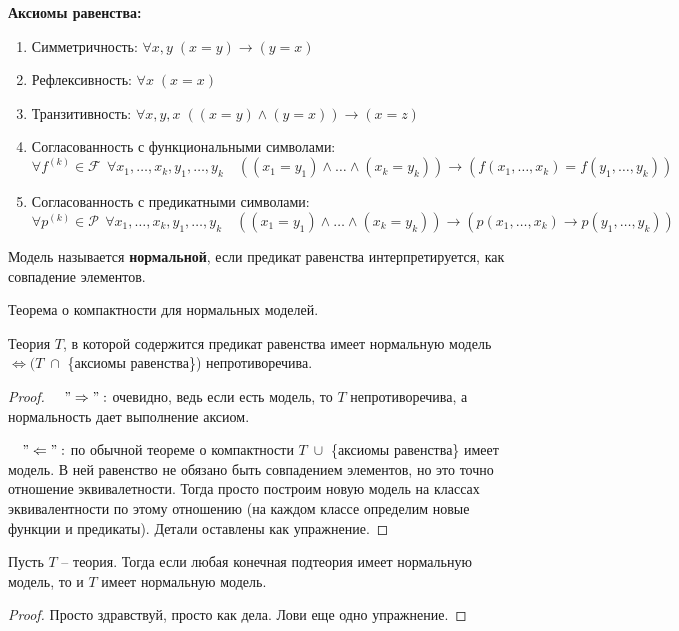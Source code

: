 \textbf{Аксиомы равенства:}
\begin{enumerate}
    \item Симметричность: $\forall x, y \; (x = y) \to (y = x)$
    \item Рефлексивность: $\forall x \; (x = x)$
    \item Транзитивность: $\forall x, y, x \; ((x = y) \land (y = x)) \to (x = z)$
    \item Согласованность с функциональными символами: \[\forall f^{(k)} \in \mathcal{F} \,\; \forall x_1, \dots, x_k, y_1, \dots, y_k \quad ((x_1 = y_1) \land \dots \land (x_k = y_k)) \to (f(x_1, \dots, x_k) = f(y_1, \dots, y_k)) \]
    \item Согласованность с предикатными символами: \[\forall p^{(k)} \in \mathcal{P} \,\; \forall x_1, \dots, x_k, y_1, \dots, y_k \quad ((x_1 = y_1) \land \dots \land (x_k = y_k)) \to (p(x_1, \dots, x_k) \to p(y_1, \dots, y_k)) \]
\end{enumerate}
\begin{conj}
    Модель называется \textbf{нормальной}, если предикат равенства интерпретируется, как совпадение элементов.
\end{conj}
\begin{theorem}
    Теорема о компактности для нормальных моделей.

    Теория $T$, в которой содержится предикат равенства имеет нормальную модель $\Longleftrightarrow (T \; \cap $ \{аксиомы равенства\}) непротиворечива.
\end{theorem}
\begin{proof}\quad

    $\quad "\Rightarrow":$ очевидно, ведь если есть модель, то $T$ непротиворечива, а нормальность дает выполнение аксиом.

    $\quad "\Leftarrow":$ по обычной теореме о компактности $T \; \cup $ \{аксиомы равенства\} имеет модель. В ней равенство не обязано быть совпадением элементов, но это точно отношение эквивалетности. Тогда просто построим новую модель на классах эквивалентности по этому отношению (на каждом классе определим новые функции и предикаты). Детали оставлены как упражнение.
\end{proof}
\begin{follow}
    Пусть $T$ -- теория. Тогда если любая конечная подтеория имеет нормальную модель, то и $T$ имеет нормальную модель.
\end{follow}
\begin{proof}
    Просто здравствуй, просто как дела. Лови еще одно упражнение.
\end{proof}

